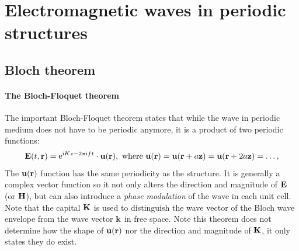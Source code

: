 \section{Electromagnetic waves in periodic structures}
\subsection{Bloch theorem}

\paragraph{The Bloch-Floquet theorem}%

The important Bloch-Floquet theorem states that while the wave in periodic medium does not have to be periodic anymore, it is a product of two periodic functions:
\begin{equation} \mathbf{E}(t, {\mathbf{r}}) = \mathrm{e}^{\mathrm{i} Kz - 2\pi \mathrm{i} f t} \cdot \mathbf{u}({\mathbf{r}}), \text{ where } \mathbf{u}({\mathbf{r}}) = \mathbf{u}({\mathbf{r}}+a\mathbf{z}) = \mathbf{u}({\mathbf{r}}+2a\mathbf{z}) = \ldots, \label{eq_bloch}\end{equation} 
The $\mathbf{u}({\mathbf{r}})$ function has the same periodicity as the structure. It is generally a complex vector function so it not only alters the direction and magnitude of $\mathbf{E}$ (or  $\mathbf{H}$), but can also introduce a \textit{phase modulation} of the wave in each unit cell. Note that the capital ${\mathbf{K}}$ is used to distinguish the wave vector of the Bloch wave envelope from the wave vector ${\mathbf{k}}$ in free space. Note this theorem does not determine how the shape of $\mathbf{u}({\mathbf{r}})$ nor the direction and magnitude of ${\mathbf{K}}$, it only states they do exist.



